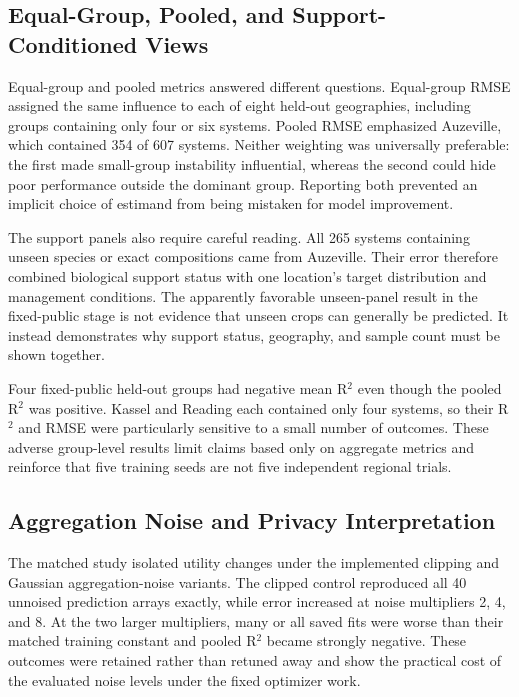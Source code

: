\documentclass[journal]{IEEEtran}
\begin{document}
\subsection{Equal-Group, Pooled, and Support-Conditioned Views}

Equal-group and pooled metrics answered different questions. Equal-group RMSE
assigned the same influence to each of eight held-out geographies, including
groups containing only four or six systems. Pooled RMSE emphasized Auzeville,
which contained 354 of 607 systems. Neither weighting was universally
preferable: the first made small-group instability influential, whereas the
second could hide poor performance outside the dominant group. Reporting both
prevented an implicit choice of estimand from being mistaken for model
improvement.

The support panels also require careful reading. All 265 systems containing
unseen species or exact compositions came from Auzeville. Their error therefore
combined biological support status with one location's target distribution and
management conditions. The apparently favorable unseen-panel result in the
fixed-public stage is not evidence that unseen crops can generally be predicted.
It instead demonstrates why support status, geography, and sample count must be
shown together.

Four fixed-public held-out groups had negative mean R$^2$ even though the pooled
R$^2$ was positive. Kassel and Reading each contained only four systems, so
their R$^2$ and RMSE were particularly sensitive to a small number of outcomes.
These adverse group-level results limit claims based only on aggregate metrics
and reinforce that five training seeds are not five independent regional trials.

\subsection{Aggregation Noise and Privacy Interpretation}

The matched study isolated utility changes under the implemented clipping and
Gaussian aggregation-noise variants. The clipped control reproduced all 40
unnoised prediction arrays exactly, while error increased at noise multipliers
2, 4, and 8. At the two larger multipliers, many or all saved fits were worse
than their matched training constant and pooled R$^2$ became strongly negative.
These outcomes were retained rather than retuned away and show the practical
cost of the evaluated noise levels under the fixed optimizer work.
\end{document}
